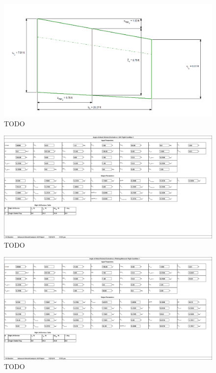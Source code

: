 \documentclass[conf]{new-aiaa}
\begin{document}
\begin{figure}
    \includegraphics[width=\textwidth]{Report3Printouts/Empannage/Vertical_volumeratio_plot.png}
    \caption{TODO}
    \label{fig:TODO}
\end{figure}


\begin{figure}
    \includegraphics[width=\textwidth]{Report3Printouts/Stability/CL_alpha.png}
    \caption{TODO}
    \label{fig:TODO}
\end{figure}

\begin{figure}
    \includegraphics[width=\textwidth]{Report3Printouts/Stability/CM_alpha_final.png}
    \caption{TODO}
    \label{fig:TODO}
\end{figure}
\end{document}
